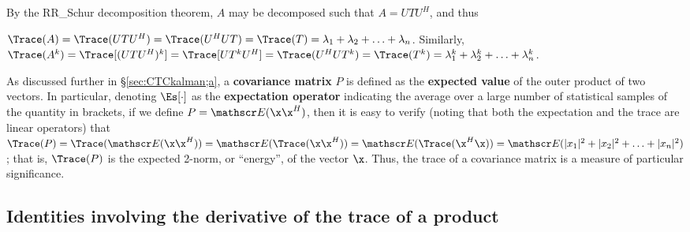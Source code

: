 \noindent By the RR_Schur decomposition theorem, $A$ may be decomposed
such that $A=UTU^{H}$, and thus

\begin{fact} \label{fact.A.F.A.b}
$\Trace(A)=\Trace(UTU^{H})=\Trace(U^{H}UT)=\Trace(T)=\lambda_{1}+\lambda_{2}+\ldots+\lambda_{n}$.  \hfill\break
Similarly,
$\Trace(A^k)=\Trace[(UTU^{H})^k]=\Trace[UT^kU^{H}]=\Trace(U^{H}UT^k)=\Trace(T^k)=\lambda_{1}^k+\lambda_{2}^k+\ldots+\lambda_{n}^k$.
\end{fact}

As discussed further in \S \ref{sec:CTCkalman;a}, a {\bf covariance matrix} $P$ is
defined as the {\bf expected value} of the outer product of two vectors. 
In particular, denoting $\Es[\cdot]$ as the {\bf expectation operator} indicating the average over a
large number of statistical samples of the quantity in brackets, if we define
$P={\mathscr E}(\x \x^{H})$, then it is easy to verify (noting that both the expectation and the trace are linear operators) that
$\Trace(P)=\Trace({\mathscr E}(\x \x^{H}))={\mathscr E}(\Trace(\x \x^{H}))={\mathscr E}(\Trace(\x^{H}\x))={\mathscr E}(|x_{1}|^{2}+|x_{2}|^{2}+\ldots+|x_{n}|^{2})$; 
that is, $\Trace(P)$ is the expected 2-norm, or ``energy'', of the vector $\x$.  Thus, the trace of a covariance matrix is a measure of particular significance.

\subsection{Identities involving the derivative of the trace of a product}

